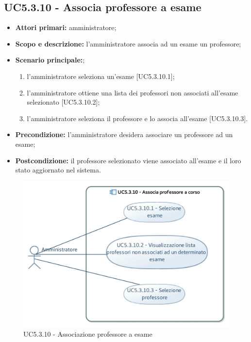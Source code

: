 \documentclass[AnalisiDeiRequisiti.tex]{subfiles}
\begin{document}
\subsection{UC5.3.10 - Associa professore a esame}
\begin{itemize}
	\item \textbf{Attori primari:} amministratore;
	\item \textbf{Scopo e descrizione:} l'amministratore associa ad un esame un professore;
	\item \textbf{Scenario principale:};
	\begin{enumerate}
		\item l'amministratore seleziona un'esame [UC5.3.10.1];
		\item l'amministratore ottiene una lista dei professori non associati all'esame selezionato [UC5.3.10.2];
		\item l'amministratore seleziona il professore e lo associa all'esame [UC5.3.10.3].
	\end{enumerate}
	\item \textbf{Precondizione:} l'amministratore desidera associare un professore ad un esame; 
	\item \textbf{Postcondizione:} il professore selezionato viene associato all'esame e il loro stato aggiornato nel sistema.
\end{itemize}
\begin{figure}[H]
	\centering
	\includegraphics[width=1.0\linewidth]{UC5_3_10.jpg}
	\caption{UC5.3.10 - Associazione professore a esame}
	\label{fig:UC5.3.10 - Associazione professore a esame}
\end{figure}
\end{document}
